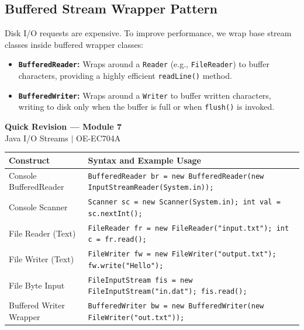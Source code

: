 \documentclass[12pt,a4paper]{article}
\renewcommand{\arraystretch}{1.45}
\begin{document}
\subsection{Buffered Stream Wrapper Pattern}
Disk I/O requests are expensive. To improve performance, we wrap base stream classes inside buffered wrapper classes:
\begin{itemize}[leftmargin=*, itemsep=3.5pt]
  \item \textbf{\texttt{BufferedReader}:} Wraps around a \texttt{Reader} (e.g., \texttt{FileReader}) to buffer characters, providing a highly efficient \texttt{readLine()} method.
  \item \textbf{\texttt{BufferedWriter}:} Wraps around a \texttt{Writer} to buffer written characters, writing to disk only when the buffer is full or when \texttt{flush()} is invoked.
\end{itemize}

\newpage
\begin{center}
  {\large\bfseries\color{myred} Quick Revision --- Module 7}\\[3pt]
  {\small\color{mydark} Java I/O Streams $|$ OE-EC704A}
\end{center}
\noindent{\color{myred}\rule{\linewidth}{1.2pt}}
\vspace{4pt}

\begin{tcolorbox}[formulabox, title={\textbf{Java I/O Stream Syntax}}]
{\renewcommand{\arraystretch}{1.3}%
\begin{tabularx}{\linewidth}{l Y}
\textbf{Construct} & \textbf{Syntax and Example Usage} \\
\hline
Console BufferedReader & \texttt{BufferedReader br = new BufferedReader(new InputStreamReader(System.in));} \\
Console Scanner & \texttt{Scanner sc = new Scanner(System.in); int val = sc.nextInt();} \\
File Reader (Text) & \texttt{FileReader fr = new FileReader("input.txt"); int c = fr.read();} \\
File Writer (Text) & \texttt{FileWriter fw = new FileWriter("output.txt"); fw.write("Hello");} \\
File Byte Input & \texttt{FileInputStream fis = new FileInputStream("in.dat"); fis.read();} \\
Buffered Writer Wrapper & \texttt{BufferedWriter bw = new BufferedWriter(new FileWriter("out.txt"));} \\
\end{tabularx}}
\end{tcolorbox}
\end{document}
